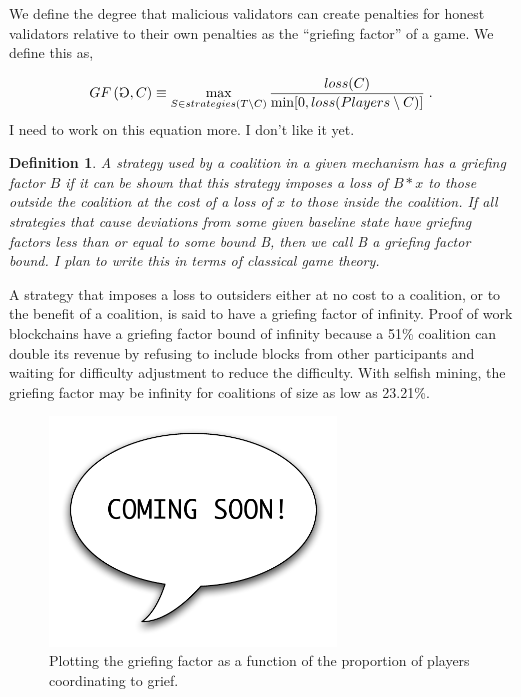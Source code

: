 \documentclass[12pt, final]{article}
\newcommand*{\todo}[1]{\color{red} #1}
\newtheorem{definition}{Definition}
\newcommand{\gamesymbol}{\reflectbox{G}}
\newcommand{\GF}[1]{GF\left( #1 \right)\space}
\begin{document}
We define the degree that malicious validators can create penalties for honest validators relative to their own penalties as the ``griefing factor'' of a game.  We define this as,

\begin{equation}
\GF{ \gamesymbol,C } \equiv \max_{S \in strategies(T \setminus C)} \frac{loss(C) }{\min[ 0, loss(Players \setminus C) ] } \; .
\end{equation}
\todo{I need to work on this equation more.  I don't like it yet.}





\begin{definition}
A strategy used by a coalition in a given mechanism has a \emph{griefing factor} $B$ if it can be shown that this strategy imposes a loss of $B * x$ to those outside the coalition at the cost of a loss of $x$ to those inside the coalition. If all strategies that cause deviations from some given baseline state have griefing factors less than or equal to some bound B, then we call B a \emph{griefing factor bound}. \todo{I plan to write this in terms of classical game theory.}
\end{definition}

A strategy that imposes a loss to outsiders either at no cost to a coalition, or to the benefit of a coalition, is said to have a griefing factor of infinity. Proof of work blockchains have a griefing factor bound of infinity because a 51\% coalition can double its revenue by refusing to include blocks from other participants and waiting for difficulty adjustment to reduce the difficulty. With selfish mining, the griefing factor may be infinity for coalitions of size as low as 23.21\%. \cite{selfishminingBTC}



\begin{figure}[h!bt]
	\centering
	\includegraphics[width=3in]{cs.pdf}
	\caption{Plotting the griefing factor as a function of the proportion of players coordinating to grief.}
	\label{fig:GF}
\end{figure}
\end{document}
